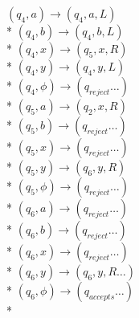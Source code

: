 \documentclass{article}
\begin{document}
\begin{multicols}{3}
\begin{addmargin}[1em]{0em}
        \columnbreak
        $(q_4, a) \rightarrow (q_4, a, L)$\\*
        $(q_4, b) \rightarrow (q_4, b, L)$\\*
        $(q_4, x) \rightarrow (q_5, x, R)$\\*
        $(q_4, y) \rightarrow (q_4, y, L)$\\*
        $(q_4, \phi) \rightarrow (q_{reject}\dots)$\\*
        $(q_5, a) \rightarrow (q_2, x, R)$\\*
        $(q_5, b) \rightarrow (q_{reject}\dots)$\\*
        $(q_5, x) \rightarrow (q_{reject}\dots)$\\*
        $(q_5, y) \rightarrow (q_6, y, R)$\\*
        $(q_5, \phi) \rightarrow (q_{reject}\dots)$\\*
        $(q_6, a) \rightarrow (q_{reject}\dots)$\\*
        $(q_6, b) \rightarrow (q_{reject}\dots)$\\*
        $(q_6, x) \rightarrow (q_{reject}\dots)$\\*
        $(q_6, y) \rightarrow (q_6, y, R\dots)$\\*
        $(q_6, \phi)\rightarrow (q_{accepts}\dots)$ \\*
    \end{addmargin}
\end{multicols}
\end{document}

